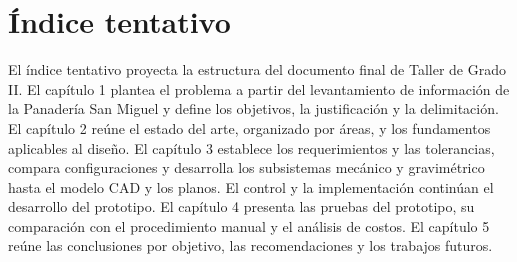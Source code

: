\section{Índice tentativo}
\label{sec:indice_tentativo}

El índice tentativo proyecta la estructura del documento final de Taller de
Grado II. El capítulo 1 plantea el problema a partir del levantamiento de
información de la Panadería San Miguel y define los objetivos, la justificación
y la delimitación. El capítulo 2 reúne el estado del arte, organizado por áreas,
y los fundamentos aplicables al diseño. El capítulo 3 establece los
requerimientos y las tolerancias, compara configuraciones y desarrolla
los subsistemas mecánico y gravimétrico hasta el modelo CAD y los planos.
El control y la implementación continúan el desarrollo del prototipo.
El capítulo 4 presenta las pruebas del prototipo, su comparación con el
procedimiento manual y el análisis de costos. El capítulo 5 reúne las
conclusiones por objetivo, las recomendaciones y los trabajos futuros.

